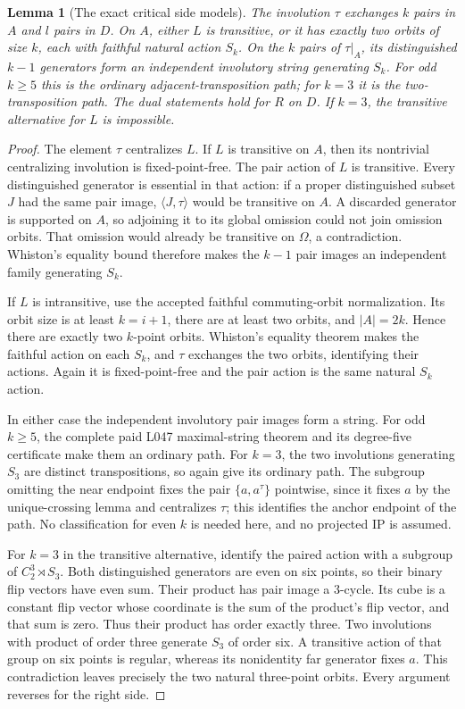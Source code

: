 \documentclass[11pt,a4paper]{article}
\newtheorem{lemma}{Lemma}
\newcommand{\gen}[1]{\langle#1\rangle}
\begin{document}
\begin{lemma}[The exact critical side models]\label{models}
The involution $\tau$ exchanges $k$ pairs in $A$ and $l$ pairs
in $D$. On $A$, either $L$ is transitive, or it has exactly two
orbits of size $k$, each with faithful natural action $S_k$.
On the $k$ pairs of $\tau|_A$, its distinguished $k-1$ generators
form an independent involutory string generating $S_k$. For odd
$k\geq5$ this is the ordinary adjacent-transposition path; for
$k=3$ it is the two-transposition path.
The dual statements hold for $R$ on $D$.
If $k=3$, the transitive alternative for $L$ is impossible.
\end{lemma}
\begin{proof}
The element $\tau$ centralizes $L$. If $L$ is transitive on
$A$, then its nontrivial centralizing involution is fixed-point-free.
The pair action of $L$ is transitive. Every distinguished generator
is essential in that action: if a proper distinguished subset $J$
had the same pair image, $\gen{J,\tau}$ would be transitive on
$A$. A discarded generator is supported on $A$, so adjoining it
to its global omission could not join omission orbits. That omission
would already be transitive on $\Omega$, a contradiction.
Whiston's equality bound therefore makes the $k-1$ pair images
an independent family generating $S_k$.

If $L$ is intransitive, use the accepted faithful commuting-orbit
normalization. Its orbit size is at least $k=i+1$, there are at
least two orbits, and $|A|=2k$. Hence there are exactly two
$k$-point orbits. Whiston's equality theorem makes the faithful
action on each $S_k$, and $\tau$ exchanges the two orbits,
identifying their actions. Again it is fixed-point-free and the
pair action is the same natural $S_k$ action.

In either case the independent involutory pair images form a string.
For odd $k\geq5$, the complete paid L047 maximal-string theorem
and its degree-five certificate make them an ordinary path. For
$k=3$, the two involutions generating $S_3$ are distinct transpositions,
so again give its ordinary path. The subgroup omitting the near
endpoint fixes the pair $\{a,a^\tau\}$ pointwise, since it fixes
$a$ by the unique-crossing lemma and centralizes $\tau$; this identifies
the anchor endpoint of the path. No classification for even $k$ is
needed here, and no projected IP is assumed.

For $k=3$ in the transitive alternative, identify the paired action
with a subgroup of $C_2^3\rtimes S_3$. Both distinguished generators
are even on six points, so their binary flip vectors have even sum.
Their product has pair image a $3$-cycle. Its cube is a constant
flip vector whose coordinate is the sum of the product's flip vector,
and that sum is zero. Thus their product has order exactly three.
Two involutions with product of order three generate $S_3$ of
order six. A transitive action of that group on six points is
regular, whereas its nonidentity far generator fixes $a$.
This contradiction leaves precisely the two natural three-point
orbits. Every argument reverses for the right side.
\end{proof}
\end{document}
